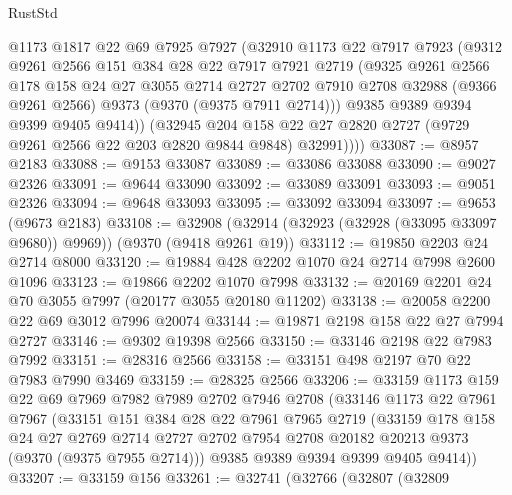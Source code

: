\begin{lexlean}{RustStd}
\begin{coremodule}
{\begin{coremodule}
{{{{{{{{{{{{{{{{{{{{{{{{{{{{{{{{{{{{{{{          @1173
          @1817
          @22
          @69
          @7925
          @7927
          (@32910
            @1173
            @22
            @7917
            @7923
            (@9312
              @9261
              @2566
              @151
              @384
              @28
              @22
              @7917
              @7921
              @2719
              (@9325
                @9261
                @2566
                @178
                @158
                @24
                @27
                @3055
                @2714
                @2727
                @2702
                @7910
                @2708
                @32988
                (@9366 @9261 @2566)
                @9373
                (@9370 (@9375 @7911 @2714)))
              @9385
              @9389
              @9394
              @9399
              @9405
              @9414))
          (@32945
            @204
            @158
            @22
            @27
            @2820
            @2727
            (@9729 @9261 @2566 @22 @203 @2820 @9844 @9848)
            @32991))))
@33087 := @8957 @2183
@33088 := @9153 @33087
@33089 := @33086 @33088
@33090 := @9027 @2326
@33091 := @9644 @33090
@33092 := @33089 @33091
@33093 := @9051 @2326
@33094 := @9648 @33093
@33095 := @33092 @33094
@33097 := @9653 (@9673 @2183)
@33108 := @32908 (@32914 (@32923 (@32928 (@33095 @33097 @9680)) @9969)) (@9370 (@9418 @9261 @19))
@33112 := @19850 @2203 @24 @2714 @8000
@33120 := @19884 @428 @2202 @1070 @24 @2714 @7998 @2600 @1096
@33123 := @19866 @2202 @1070 @7998
@33132 := @20169 @2201 @24 @70 @3055 @7997 (@20177 @3055 @20180 @11202)
@33138 := @20058 @2200 @22 @69 @3012 @7996 @20074
@33144 := @19871 @2198 @158 @22 @27 @7994 @2727
@33146 := @9302 @19398 @2566
@33150 := @33146 @2198 @22 @7983 @7992
@33151 := @28316 @2566
@33158 := @33151 @498 @2197 @70 @22 @7983 @7990 @3469
@33159 := @28325 @2566
@33206 := @33159
    @1173
    @159
    @22
    @69
    @7969
    @7982
    @7989
    @2702
    @7946
    @2708
    (@33146
      @1173
      @22
      @7961
      @7967
      (@33151
        @151
        @384
        @28
        @22
        @7961
        @7965
        @2719
        (@33159
          @178
          @158
          @24
          @27
          @2769
          @2714
          @2727
          @2702
          @7954
          @2708
          @20182
          @20213
          @9373
          (@9370 (@9375 @7955 @2714)))
        @9385
        @9389
        @9394
        @9399
        @9405
        @9414))
@33207 := @33159 @156
@33261 := @32741
    (@32766
      (@32807
        (@32809
}}}}}}}}}}}}}}}}}}}}}}}}}}}}}}}}}}}}}}}
\end{coremodule}}
\end{coremodule}
\end{lexlean}
